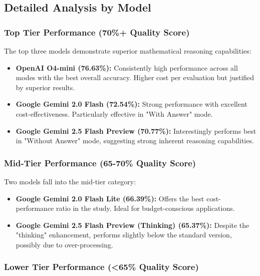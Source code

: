 \documentclass[11pt]{article}
\begin{document}
\subsection{Detailed Analysis by Model}

\subsubsection{Top Tier Performance (70\%+ Quality Score)}

The top three models demonstrate superior mathematical reasoning capabilities:

\begin{itemize}
\item \textbf{OpenAI O4-mini (76.63\%):} Consistently high performance across all modes with the best overall accuracy. Higher cost per evaluation but justified by superior results.

\item \textbf{Google Gemini 2.0 Flash (72.54\%):} Strong performance with excellent cost-effectiveness. Particularly effective in "With Answer" mode.

\item \textbf{Google Gemini 2.5 Flash Preview (70.77\%):} Interestingly performs best in "Without Answer" mode, suggesting strong inherent reasoning capabilities.
\end{itemize}

\subsubsection{Mid-Tier Performance (65-70\% Quality Score)}

Two models fall into the mid-tier category:

\begin{itemize}
\item \textbf{Google Gemini 2.0 Flash Lite (66.39\%):} Offers the best cost-performance ratio in the study. Ideal for budget-conscious applications.

\item \textbf{Google Gemini 2.5 Flash Preview (Thinking) (65.37\%):} Despite the "thinking" enhancement, performs slightly below the standard version, possibly due to over-processing.
\end{itemize}

\subsubsection{Lower Tier Performance (<65\% Quality Score)}
\end{document}
